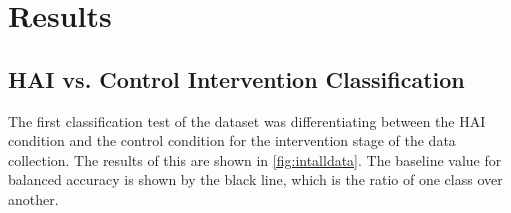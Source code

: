\documentclass[12pt]{iopart}
\begin{document}

\section*{Results}
\subsection*{HAI vs. Control Intervention Classification}

The first classification test of the dataset was differentiating between the HAI condition and the control condition for the intervention stage of the data collection.  The results of this are shown in \ref{fig:intalldata}.  The baseline value for balanced accuracy is shown by the black line, which is the ratio of one class over another.
\end{document}
